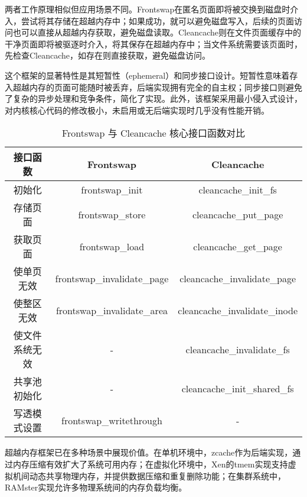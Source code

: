 两者工作原理相似但应用场景不同。Frontswap在匿名页面即将被交换到磁盘时介入，尝试将其存储在超越内存中；如果成功，就可以避免磁盘写入，后续的页面访问也可以直接从超越内存获取，避免磁盘读取。Cleancache则在文件页面缓存中的干净页面即将被驱逐时介入，将其保存在超越内存中；当文件系统需要该页面时，先检查Cleancache，如存在则直接获取，避免磁盘访问。

这个框架的显著特性是其短暂性（ephemeral）和同步接口设计。短暂性意味着存入超越内存的页面可能随时被丢弃，后端实现拥有完全的自主权；同步接口则避免了复杂的异步处理和竞争条件，简化了实现。此外，该框架采用最小侵入式设计，对内核核心代码的修改极小，未启用或无后端实现时几乎没有性能开销。

\begin{table}[htbp]
    \caption{Frontswap 与 Cleancache 核心接口函数对比}
    \begin{tabularx}{\textwidth}{ccc} %
    \toprule
    \textbf{接口函数} & \textbf{Frontswap} & \textbf{Cleancache} \\
    \midrule
    初始化 & frontswap\_init & cleancache\_init\_fs \\
    
    存储页面 & frontswap\_store & cleancache\_put\_page \\
    
    获取页面 & frontswap\_load & cleancache\_get\_page \\
    
    使单页无效 & frontswap\_invalidate\_page & cleancache\_invalidate\_page \\
    
    使整区无效 & frontswap\_invalidate\_area & cleancache\_invalidate\_inode \\
    
    使文件系统无效 & - & cleancache\_invalidate\_fs \\
    
    共享池初始化 & - & cleancache\_init\_shared\_fs \\
    
    写透模式设置 & frontswap\_writethrough & - \\
    \bottomrule
    \end{tabularx}
    \end{table}


超越内存框架已在多种场景中展现价值。在单机环境中，zcache作为后端实现，通过内存压缩有效扩大了系统可用内存；在虚拟化环境中，Xen的tmem实现支持虚拟机间动态共享物理内存，并提供数据压缩和重复删除功能；在集群系统中，RAMster实现允许多物理系统间的内存负载均衡。

